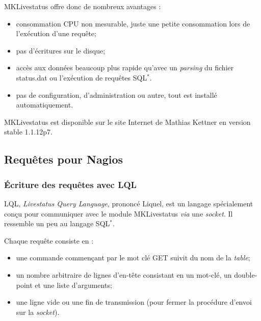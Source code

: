 \noindent MKLivestatus offre donc de nombreux avantages :

\begin{itemize}
	\item consommation CPU non mesurable, juste une petite consommation lors de l'ex\'ecution d'une requ\^ete;
	\item pas d'\'ecritures sur le disque;
	\item acc\`es aux donn\'ees beaucoup plus rapide qu'avec un \textit{parsing} du fichier \textsf{status.dat} ou l'ex\'ecution de requ\^etes SQL$^*$.
	\item pas de configuration, d'administration ou autre, tout est install\'e automatiquement.

\end{itemize}

\vspace{0.20cm}

MKLivestatus est disponible sur le site Internet\cite{biblio:siteMklivestatus} de Mathias Kettner en version stable 1.1.12p7.

\subsection{Requ\^etes pour Nagios}

\subsubsection{\'Ecriture des requ\^etes avec LQL}

LQL, \textit{Livestatus Query Language}, prononc\'e \og Liquel\fg, est un langage sp\'ecialement con\c{c}u pour communiquer avec le module MKLivestatus \textit{via} une \textit{socket}.
Il ressemble un peu au langage SQL$^*$.

\noindent Chaque requ\^ete consiste en :

\begin{itemize}
	\item une commande commen\c{c}ant par le mot cl\'e \textsf{GET} suivit du nom de la \textit{table};
	\item un nombre arbitraire de lignes d'en-t\^ete consistant en un mot-cl\'e, un double-point et une liste d'arguments;
	\item une ligne vide ou une fin de transmission (pour fermer la proc\'edure d'envoi sur la \textit{socket}).

\end{itemize}

\vspace{0.20cm}

